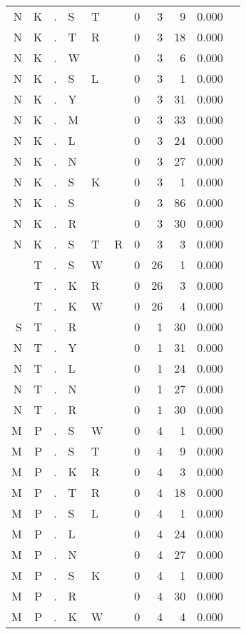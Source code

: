 \begin{longtable}{r@{ } r@{ } c@{ } l@{ } l@{ } l@{ } r r r r l }
N & K & . & S & T &   & 0 & 3 & 9 & 0.000 &  \\
N & K & . & T & R &   & 0 & 3 & 18 & 0.000 &  \\
N & K & . & W &   &   & 0 & 3 & 6 & 0.000 &  \\
N & K & . & S & L &   & 0 & 3 & 1 & 0.000 &  \\
N & K & . & Y &   &   & 0 & 3 & 31 & 0.000 &  \\
N & K & . & M &   &   & 0 & 3 & 33 & 0.000 &  \\
N & K & . & L &   &   & 0 & 3 & 24 & 0.000 &  \\
N & K & . & N &   &   & 0 & 3 & 27 & 0.000 &  \\
N & K & . & S & K &   & 0 & 3 & 1 & 0.000 &  \\
N & K & . & S &   &   & 0 & 3 & 86 & 0.000 &  \\
N & K & . & R &   &   & 0 & 3 & 30 & 0.000 &  \\
N & K & . & S & T & R & 0 & 3 & 3 & 0.000 &  \\
  & T & . & S & W &   & 0 & 26 & 1 & 0.000 &  \\
  & T & . & K & R &   & 0 & 26 & 3 & 0.000 &  \\
  & T & . & K & W &   & 0 & 26 & 4 & 0.000 &  \\
S & T & . & R &   &   & 0 & 1 & 30 & 0.000 &  \\
N & T & . & Y &   &   & 0 & 1 & 31 & 0.000 &  \\
N & T & . & L &   &   & 0 & 1 & 24 & 0.000 &  \\
N & T & . & N &   &   & 0 & 1 & 27 & 0.000 &  \\
N & T & . & R &   &   & 0 & 1 & 30 & 0.000 &  \\
M & P & . & S & W &   & 0 & 4 & 1 & 0.000 &  \\
M & P & . & S & T &   & 0 & 4 & 9 & 0.000 &  \\
M & P & . & K & R &   & 0 & 4 & 3 & 0.000 &  \\
M & P & . & T & R &   & 0 & 4 & 18 & 0.000 &  \\
M & P & . & S & L &   & 0 & 4 & 1 & 0.000 &  \\
M & P & . & L &   &   & 0 & 4 & 24 & 0.000 &  \\
M & P & . & N &   &   & 0 & 4 & 27 & 0.000 &  \\
M & P & . & S & K &   & 0 & 4 & 1 & 0.000 &  \\
M & P & . & R &   &   & 0 & 4 & 30 & 0.000 &  \\
M & P & . & K & W &   & 0 & 4 & 4 & 0.000 &  \\

\end{longtable}
